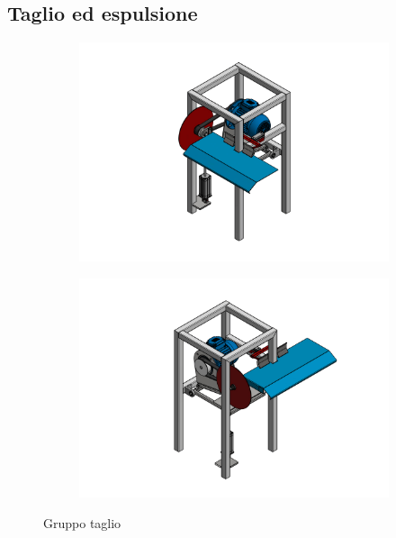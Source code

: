 \documentclass{report}
\begin{document}
\subsection{Taglio ed espulsione}
\begin{figure}[H]
  \centering
  \begin{subfigure}[H]{0.45\textwidth}
    \centering
    \includegraphics[width=\textwidth]{src/img/taglio_1.pdf}
  \end{subfigure}
  \hfill
  \begin{subfigure}[H]{0.45\textwidth}
    \centering
    \includegraphics[width=\textwidth]{src/img/taglio_2.pdf}
    \end{subfigure}
    \caption{Gruppo taglio}
    \label{fig:vtcons}
\end{figure}
\end{document}
